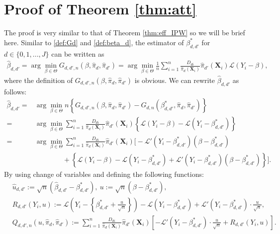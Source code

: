 \documentclass[11pt]{article}
\numberwithin{equation}{section}
\begin{document}
\section{Proof of Theorem \ref{thm:att}}
The proof is very similar to that of Theorem \ref{thm:eff_IPW} so we will be brief here.
Similar to \eqref{def:Gd} and \eqref{def:beta_d}, the estimator of $\beta^*_{d,d'}$ for $d\in\{0,1,...,J\}$ can be written as
\begin{align*}
	\widehat{\beta}_{d,d'}=\arg\min_{\beta\in\Theta}G_{d,d',n}(\beta,\widehat{\pi}_d,\widehat{\pi}_{d'})=\arg\min_{\beta\in\Theta}\frac{1}{n}\sum_{i=1}^n\frac{D_{di}}{\widehat{\pi}_{d}(\boldsymbol{X}_{i})}\widehat{\pi}_{d'}(\boldsymbol{X}_{i}) \mathcal{L}\left(Y_i-\beta\right),
\end{align*}
where the definition of $G_{d,d',n}(\beta,\widehat{\pi}_d,\widehat{\pi}_{d'})$ is obvious. We can rewrite $ \widehat{\beta}_{d,d'}$ as follows:
\begin{align*}
	\widehat{\beta}_{d,d'}=&\arg\min_{\beta\in\Theta} n\left\{G_{d,d',n}(\beta,\widehat{\pi}_d,\widehat{\pi}_{d'})-G_{d,n}(\beta_{d,d'}^*,\widehat{\pi}_d,\widehat{\pi}_{d'}) \right\}\\
	=&\arg\min_{\beta\in\Theta}\sum_{i=1}^n\frac{D_{di}}{\widehat{\pi}_d(\boldsymbol{X}_{i})}\widehat{\pi}_{d'}(\boldsymbol{X}_{i})\left\{\mathcal{L}(Y_i-\beta)-\mathcal{L}(Y_i-\beta_{d,d'}^*)\right\}\\
	=&\arg\min_{\beta\in\Theta}\sum_{i=1}^n\frac{D_{di}}{\widehat{\pi}_d(\boldsymbol{X}_{i})}\widehat{\pi}_{d'}(\boldsymbol{X}_{i})\bigg[-\mathcal{L}'(Y_i-\beta_{d,d'}^*)(\beta-\beta_{d,d'}^*)\\
	&\qquad\qquad+\left\{\mathcal{L}(Y_i-\beta)-\mathcal{L}(Y_i-\beta_{d,d'}^*)+\mathcal{L}'(Y_i-\beta_{d,d'}^*)(\beta-\beta_{d,d'}^*)\right\}\bigg].
\end{align*}
By using change of variables and defining the following functions:
\begin{align*}
	&\widehat{u}_{d,d'}:=\sqrt{n}(\widehat{\beta}_{d,d'}-{\beta}_{d,d'}^*), \  u:=\sqrt{n}(\beta-{\beta}_{d,d'}^*),\\
	&R_{d,d'}(Y_i,u):=\mathcal{L}\left(Y_i-\left\{\beta_{d,d'}^*+\frac{u}{\sqrt{n}}\right\}\right)-\mathcal{L}(Y_i-\beta_{d,d'}^*)+\mathcal{L}'(Y_i-\beta_{d,d'}^*)\cdot \frac{u}{\sqrt{n}},\\
	&Q_{d,d',n}(u,\widehat{\pi}_d,\widehat{\pi}_{d'}):=\sum_{i=1}^n\frac{D_{di}}{\widehat{\pi}_d(\boldsymbol{X}_{i})}\widehat{\pi}_{d'}(\boldsymbol{X}_{i})\left[-\mathcal{L}'(Y_i-\beta_{d,d'}^*)\cdot \frac{u}{\sqrt{n}}+R_{d,d'}(Y_i,u)\right].
\end{align*}
\end{document}
